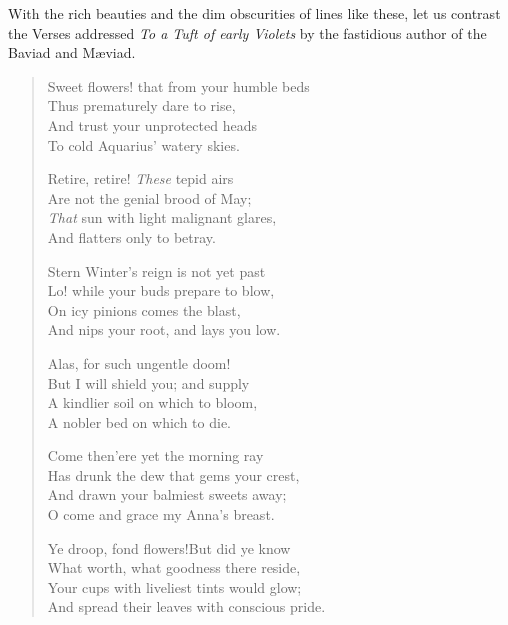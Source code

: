 With the rich beauties and the dim obscurities of lines like these, let
us contrast the Verses addressed \emph{To a Tuft of early Violets} by the
fastidious author of the Baviad and Mæviad.\textemdash 
\begin{verse}
  \begin{altverse}
    Sweet flowers! that from your humble beds \\
    Thus prematurely dare to rise, \\
    And trust your unprotected heads \\
    To cold Aquarius' watery skies.
  \end{altverse}

  \begin{altverse}
    Retire, retire! \emph{These} tepid airs \\
    Are not the genial brood of May; \\
    \emph{That} sun with light malignant glares, \\
    And flatters only to betray.
  \end{altverse}

  \begin{altverse}
    Stern Winter's reign is not yet past\textemdash \\
    Lo! while your buds prepare to blow, \\
    On icy pinions comes the blast, \\
    And nips your root, and lays you low.
  \end{altverse}

  \begin{altverse}
    Alas, for such ungentle doom!  \\
    But I will shield you; and supply \\
    A kindlier soil on which to bloom, \\
    A nobler bed on which to die.
  \end{altverse}

  \begin{altverse}
    Come then\textemdash 'ere yet the morning ray
  \\
  Has drunk the dew that gems your crest, \\
  And drawn your balmiest sweets away; \\
  O come and grace my Anna's breast.
  \end{altverse}

  \begin{altverse}
    Ye droop, fond flowers!But did ye know \\
    What worth, what goodness there reside, \\
    Your cups with liveliest tints would glow; \\
    And spread their leaves with conscious pride.
  \end{altverse}


\end{verse}
